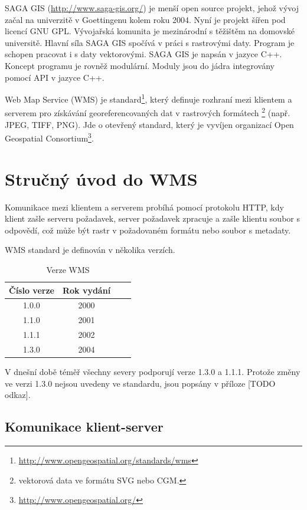 \documentclass[a4paper,12pt]{article}
\begin{document}
SAGA GIS (\url{http://www.saga-gis.org/}) je menší open source projekt, jehož vývoj začal na
 univerzitě v Goettingenu kolem roku 2004. Nyní je projekt šířen pod  licencí GNU GPL. Vývojařská 
komunita je mezinárodní s těžištěm na domovské universitě. Hlavní síla SAGA GIS spočívá v práci s rastrovými daty. Program je schopen pracovat i s daty vektorovými. 
SAGA GIS je napsán v jazyce  C++.  Koncept programu je rovněž modulární. Moduly jsou do jádra integrovány pomocí API v jazyce C++.

Web Map Service (WMS) je standard\footnote{\url{http://www.opengeospatial.org/standards/wms}}, který definuje rozhraní mezi klientem 
a serverem pro získávání georeferencovaných dat v rastrových formátech \footnote{ vektorová data ve formátu SVG nebo CGM.} (např. JPEG, TIFF, PNG). 
Jde o otevřený standard, který je vyvíjen organizací Open Geospatial Consortium\footnote{\url{http://www.opengeospatial.org/}}.  


\newpage
\section{Stručný úvod do WMS}

Komunikace mezi klientem a serverem probíhá pomocí protokolu HTTP, kdy klient zašle serveru požadavek, 
server požadavek zpracuje a  zašle klientu soubor s odpovědí, což může být rastr v požadovaném formátu nebo soubor s metadaty.

WMS standard je definován v několika verzích.

\begin{table}[h]
\centering
\begin{tabular}{|c|c|c|c|}      \hline
  Číslo verze  & Rok vydání  \\ \hline
  1.0.0        &  2000       \\ \hline
  1.1.0        &  2001       \\ \hline
  1.1.1        &  2002       \\ \hline
  1.3.0        &  2004       \\ \hline
\end{tabular}
\caption{Verze WMS}
\label{tab:verze}
\end{table}

V dnešní době téměř všechny severy podporují verze 1.3.0 a 1.1.1. Protože
změny ve verzi 1.3.0 nejsou uvedeny ve standardu, jsou popsány v příloze [TODO odkaz].


\subsection{Komunikace klient-server}
\end{document}
